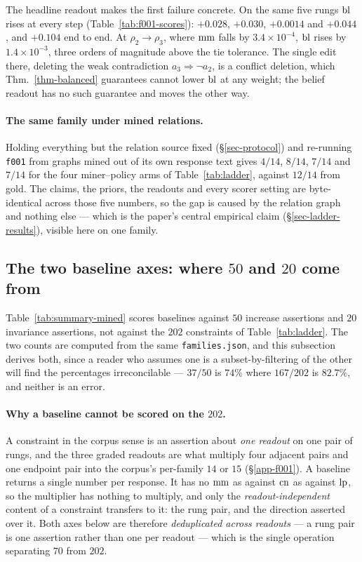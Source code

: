 The headline readout makes the first failure concrete. On the same five rungs $\mathrm{bl}$ rises at every
step (Table~\ref{tab:f001-scores}): $+0.028$, $+0.030$, $+0.0014$ and $+0.044$, and $+0.104$ end to
end. At $\rho_2\to\rho_3$, where $\mathrm{mm}$ falls by $3.4\times10^{-4}$, $\mathrm{bl}$ rises by $1.4\times10^{-3}$,
three orders of magnitude above the tie tolerance. The single edit there, deleting the weak
 contradiction $a_3\Rightarrow\neg a_2$, is a conflict deletion, which
Thm.~\ref{thm-balanced} guarantees cannot lower $\mathrm{bl}$ at any weight; the belief readout has no such
guarantee and moves the other way.

\paragraph{The same family under mined relations.} Holding everything but the relation source fixed
(\S\ref{sec-protocol}) and re-running \texttt{f001} from graphs mined out of its own response text gives
$4/14$, $8/14$, $7/14$ and $7/14$ for the four miner--policy arms of Table~\ref{tab:ladder}, against
$12/14$ from gold. The claims, the priors, the readouts and every scorer setting are byte-identical
across those five numbers, so the gap is caused by the relation graph and nothing else --- which is the
paper's central empirical claim (\S\ref{sec-ladder-results}), visible here on one family.

\subsection{The two baseline axes: where \texorpdfstring{$50$}{50} and \texorpdfstring{$20$}{20} come from}
\label{app-axes}

Table~\ref{tab:summary-mined} scores baselines against $50$ increase assertions and $20$ invariance
assertions, not against the $202$ constraints of Table~\ref{tab:ladder}. The two counts are computed
from the same \texttt{families.json}, and this subsection derives both, since a reader who assumes one
is a subset-by-filtering of the other will find the percentages irreconcilable --- $37/50$ is $74\%$
where $167/202$ is $82.7\%$, and neither is an error.

\paragraph{Why a baseline cannot be scored on the $202$.} A constraint in the corpus sense is an
assertion about \emph{one readout} on one pair of rungs, and the three graded readouts are what multiply
four adjacent pairs and one endpoint pair into the corpus's per-family $14$ or $15$
(\S\ref{app-f001}). A baseline returns a single number per response. It has no $\mathrm{mm}$ as against $\mathrm{cn}$
as against $\mathrm{lp}$, so the multiplier has nothing to multiply, and only the
\emph{readout-independent} content of a constraint transfers to it: the rung pair, and the direction
asserted over it. Both axes below are therefore \emph{deduplicated across readouts} --- a rung pair is
one assertion rather than one per readout --- which is the single operation separating $70$ from $202$.

